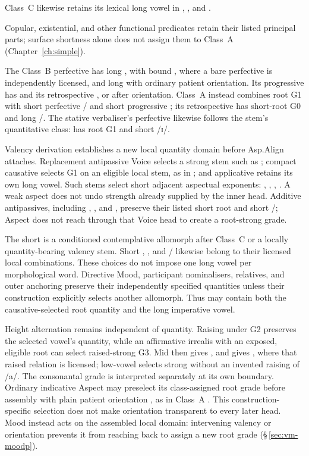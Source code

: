 Class~C  likewise retains its lexical long vowel in
, , and .

Copular, existential, and other functional predicates retain their listed
principal parts; surface shortness alone does not assign them to Class~A
(Chapter~\ref{ch:simple}).

The Class~B perfective has long , with bound ,
where a bare perfective is independently licensed, and long 
with ordinary patient orientation. Its progressive has 
and its retrospective , or  after orientation.
Class~A instead combines root G1 with short perfective
/ and short progressive ; its
retrospective has short-root G0 and long /.
The stative verbaliser's perfective  likewise follows the
stem's quantitative class:  has root G1 and short /ɪ/.

Valency derivation establishes a new local quantity domain before
Asp.Align attaches. Replacement antipassive Voice selects a strong
stem such as ; compact causative  selects G1
on an eligible local stem, as in ; and applicative
 retains its own long vowel. Such stems select short
adjacent aspectual exponents: , ,
, . A weak aspect does not undo
strength already supplied by the inner head. Additive antipassives,
including , , and , preserve their
listed short root and short /; Aspect does not
reach through that Voice head to create a root-strong grade.

The short  is a conditioned contemplative allomorph after
Class~C or a locally quantity-bearing valency stem. Short
, , and / likewise belong
to their licensed local combinations. These choices do not impose
one long vowel per morphological word. Directive Mood, participant
nominalisers, relatives, and outer anchoring preserve their independently
specified quantities unless their construction explicitly selects
another allomorph. Thus  may contain both the
causative-selected root quantity and the long imperative vowel.

Height alternation remains independent of quantity. Raising under G2
preserves the selected vowel's quantity, while an affirmative irrealis
with an exposed, eligible root can select raised-strong G3. Mid
 then gives , and  gives , where
that raised relation is licensed; low-vowel  selects
strong  without an invented raising of /a/.
The consonantal grade is interpreted separately at its own boundary.
Ordinary indicative Aspect may preselect its class-assigned root grade
before assembly with plain patient orientation , as in
Class~A . This construction-specific selection does not
make orientation transparent to every later head. Mood instead acts on
the assembled local domain: intervening valency or orientation prevents
it from reaching back to assign a new root grade
(§\,\ref{sec:vm-moodp}).


